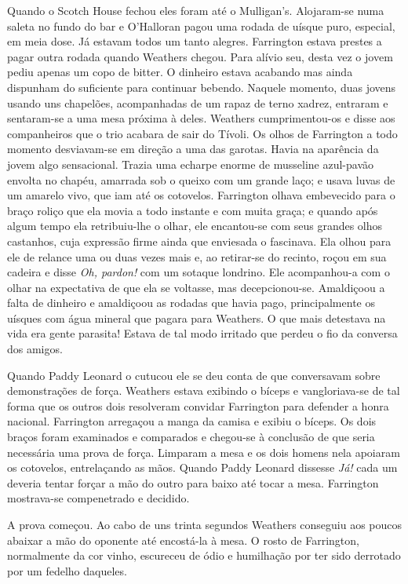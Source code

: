 Quando o Scotch House fechou eles foram até o Mulligan's. Alojaram-se
numa saleta no fundo do bar e O'Halloran pagou uma rodada de uísque
puro, especial, em meia dose. Já estavam todos um tanto alegres.
Farrington estava prestes a pagar outra rodada quando Weathers chegou.
Para alívio seu, desta vez o jovem pediu apenas um copo de bitter. O
dinheiro estava acabando mas ainda dispunham do suficiente para
continuar bebendo. Naquele momento, duas jovens usando uns chapelões,
acompanhadas de um rapaz de terno xadrez, entraram e sentaram-se a
uma mesa próxima à deles. Weathers cumprimentou-os e disse aos
companheiros que o trio acabara de sair do Tívoli. Os olhos de
Farrington a todo momento desviavam-se em direção a uma das garotas.
Havia na aparência da jovem algo sensacional. Trazia uma echarpe
enorme de musseline azul-pavão envolta no chapéu, amarrada sob o
queixo com um grande laço; e usava luvas de um amarelo vivo, que iam
até os cotovelos. Farrington olhava embevecido para o braço roliço que
ela movia a todo instante e com muita graça; e quando após algum tempo
ela retribuiu-lhe o olhar, ele encantou-se com seus grandes olhos
castanhos, cuja expressão firme ainda que enviesada o fascinava. Ela
olhou para ele de relance uma ou duas vezes mais e, ao retirar-se do
recinto, roçou em sua cadeira e disse \textit{Oh, pardon!} com um sotaque
londrino. Ele acompanhou-a com o olhar na expectativa de que ela se
voltasse, mas decepcionou-se. Amaldiçoou a falta de dinheiro e
amaldiçoou as rodadas que havia pago, principalmente os uísques com
água mineral que pagara para Weathers. O que mais detestava na vida
era gente parasita! Estava de tal modo irritado que perdeu o fio da
conversa dos amigos.

Quando Paddy Leonard o cutucou ele se deu conta de que conversavam
sobre demonstrações de força. Weathers estava exibindo o bíceps e
vangloriava-se de tal forma que os outros dois resolveram convidar
Farrington para defender a honra nacional. Farrington arregaçou a
manga da camisa e exibiu o bíceps. Os dois braços foram examinados e
comparados e chegou-se à conclusão de que seria necessária uma prova
de força. Limparam a mesa e os dois homens nela apoiaram os cotovelos,
entrelaçando as mãos. Quando Paddy Leonard dissesse \textit{Já!} cada um
deveria tentar forçar a mão do outro para baixo até tocar a mesa.
Farrington mostrava-se compenetrado e decidido.

A prova começou. Ao cabo de uns trinta segundos Weathers conseguiu aos
poucos abaixar a mão do oponente até encostá-la à mesa. O rosto de
Farrington, normalmente da cor vinho, escureceu de ódio e humilhação
por ter sido derrotado por um fedelho daqueles.

